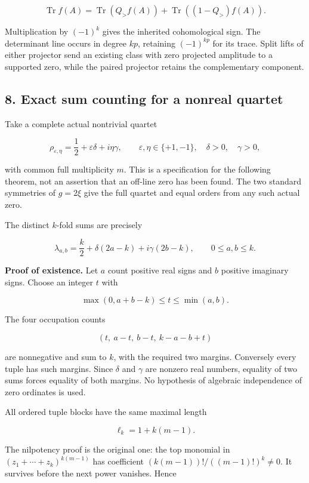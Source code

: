 \[
\operatorname{Tr}f(A)
=\operatorname{Tr}(Q_{>}f(A))
 +\operatorname{Tr}((1-Q_{>})f(A)).
\]

Multiplication by \((-1)^k\) gives the inherited cohomological sign. The
determinant line occurs in degree \(kp\), retaining \((-1)^{kp}\) for
its trace. Split lifts of either projector send an existing class with
zero projected amplitude to a supported zero, while the paired projector
retains the complementary component.

\subsection{8. Exact sum counting for a nonreal
quartet}\label{exterior_trace:exact-sum-counting-for-a-nonreal-quartet}

Take a complete actual nontrivial quartet

\[
\rho_{\varepsilon,\eta}
=\frac12+\varepsilon\delta+i\eta\gamma,
\qquad \varepsilon,\eta\in\{+1,-1\},\quad
\delta>0,\quad\gamma>0,
\]

with common full multiplicity \(m\). This is a specification for the
following theorem, not an assertion that an off-line zero has been
found. The two standard symmetries of \(g=2\xi\) give the full quartet
and equal orders from any such actual zero.

The distinct \(k\)-fold sums are precisely

\[
\boxed{
\lambda_{a,b}
=\frac k2+\delta(2a-k)+i\gamma(2b-k),
\qquad 0\leq a,b\leq k.
}
\]

\textbf{Proof of existence.} Let \(a\) count positive real signs and
\(b\) positive imaginary signs. Choose an integer \(t\) with

\[
\max(0,a+b-k)\leq t\leq\min(a,b).
\]

The four occupation counts

\[
(t,\ a-t,\ b-t,\ k-a-b+t)
\]

are nonnegative and sum to \(k\), with the required two margins.
Conversely every tuple has such margins. Since \(\delta\) and \(\gamma\)
are nonzero real numbers, equality of two sums forces equality of both
margins. No hypothesis of algebraic independence of zero ordinates is
used.

All ordered tuple blocks have the same maximal length

\[
\ell_k=1+k(m-1).
\]

The nilpotency proof is the original one: the top monomial in
\((z_1+\cdots+z_k)^{k(m-1)}\) has coefficient
\((k(m-1))!/((m-1)!)^k\ne0\). It survives before the next power
vanishes. Hence

